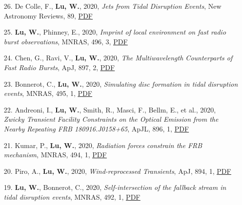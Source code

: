 \begin{itemize}[leftmargin=0.65cm]
\vspace{-0.1cm}
\item[26.]{De Colle, F., {\bf Lu, W.}, 2020, {\it Jets from Tidal Disruption Events}, New Astronomy Reviews, 89, \href{https://ui.adsabs.harvard.edu/abs/2020NewAR..8901538D}{\underline{PDF}}}

\vspace{-0.1cm}
\item[25.]{{\bf Lu, W.}, Phinney, E., 2020, {\it Imprint of local environment on fast radio burst observations}, MNRAS, 496, 3, \href{https://ui.adsabs.harvard.edu/abs/2020MNRAS.496.3308L}{\underline{PDF}}}

\vspace{-0.1cm}
\item[24.]{Chen, G., Ravi, V., {\bf Lu, W.}, 2020, {\it The Multiwavelength Counterparts of Fast Radio Bursts}, ApJ, 897, 2, \href{https://ui.adsabs.harvard.edu/abs/2020ApJ...897..146C}{\underline{PDF}}}

\vspace{-0.1cm}
\item[23.]{Bonnerot, C., {\bf Lu, W.}, 2020, {\it Simulating disc formation in tidal disruption events}, MNRAS, 495, 1, \href{https://ui.adsabs.harvard.edu/abs/2020MNRAS.495.1374B}{\underline{PDF}}}

\vspace{-0.1cm}
\item[22.]{Andreoni, I., {\bf Lu, W.}, Smith, R., Masci, F., Bellm, E., et al., 2020, {\it Zwicky Transient Facility Constraints on the Optical Emission from the Nearby Repeating FRB 180916.J0158+65}, ApJL, 896, 1, \href{https://ui.adsabs.harvard.edu/abs/2020ApJ...896L...2A}{\underline{PDF}}}

\vspace{-0.1cm}
\item[21.]{Kumar, P., {\bf Lu, W.}, 2020, {\it Radiation forces constrain the FRB mechanism}, MNRAS, 494, 1, \href{https://ui.adsabs.harvard.edu/abs/2020MNRAS.494.1217K}{\underline{PDF}}}

\vspace{-0.1cm}
\item[20.]{Piro, A., {\bf Lu, W.}, 2020, {\it Wind-reprocessed Transients}, ApJ, 894, 1, \href{https://ui.adsabs.harvard.edu/abs/2020ApJ...894....2P}{\underline{PDF}}}

\vspace{-0.1cm}
\item[19.]{{\bf Lu, W.}, Bonnerot, C., 2020, {\it Self-intersection of the fallback stream in tidal disruption events}, MNRAS, 492, 1, \href{https://ui.adsabs.harvard.edu/abs/2020MNRAS.492..686L}{\underline{PDF}}}


\end{itemize}
